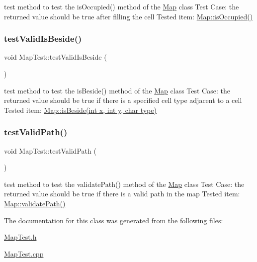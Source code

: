 test method to test the is\+Occupied() method of the \hyperlink{classMap}{Map} class Test Case\+: the returned value should be true after filling the cell Tested item\+: \hyperlink{classMap_a79e5ced99d160ca9b680661169f16d84}{Map\+::is\+Occupied()} \hypertarget{classMapTest_a272b34d1f908c9105f631512aa395165}{}\label{classMapTest_a272b34d1f908c9105f631512aa395165} 
\subsubsection{\texorpdfstring{test\+Valid\+Is\+Beside()}{testValidIsBeside()}}
{\footnotesize\ttfamily void Map\+Test\+::test\+Valid\+Is\+Beside (\begin{DoxyParamCaption}{ }\end{DoxyParamCaption})\hspace{0.3cm}{\ttfamily [protected]}}

test method to test the is\+Beside() method of the \hyperlink{classMap}{Map} class Test Case\+: the returned value should be true if there is a specified cell type adjacent to a cell Tested item\+: \hyperlink{classMap_a7ba2837b589493924b726dc326d68e8e}{Map\+::is\+Beside(int x, int y, char type)} \hypertarget{classMapTest_ae7a28d196c97101aa248a326af2a3f5b}{}\label{classMapTest_ae7a28d196c97101aa248a326af2a3f5b} 
\subsubsection{\texorpdfstring{test\+Valid\+Path()}{testValidPath()}}
{\footnotesize\ttfamily void Map\+Test\+::test\+Valid\+Path (\begin{DoxyParamCaption}{ }\end{DoxyParamCaption})\hspace{0.3cm}{\ttfamily [protected]}}

test method to test the validate\+Path() method of the \hyperlink{classMap}{Map} class Test Case\+: the returned value should be true if there is a valid path in the map Tested item\+: \hyperlink{classMap_a91d9e239a9871b99a5d6d2d5d46b0504}{Map\+::validate\+Path()} 

The documentation for this class was generated from the following files\+:\begin{DoxyCompactItemize}
\item 
\hyperlink{MapTest_8h}{Map\+Test.\+h}\item 
\hyperlink{MapTest_8cpp}{Map\+Test.\+cpp}\end{DoxyCompactItemize}
